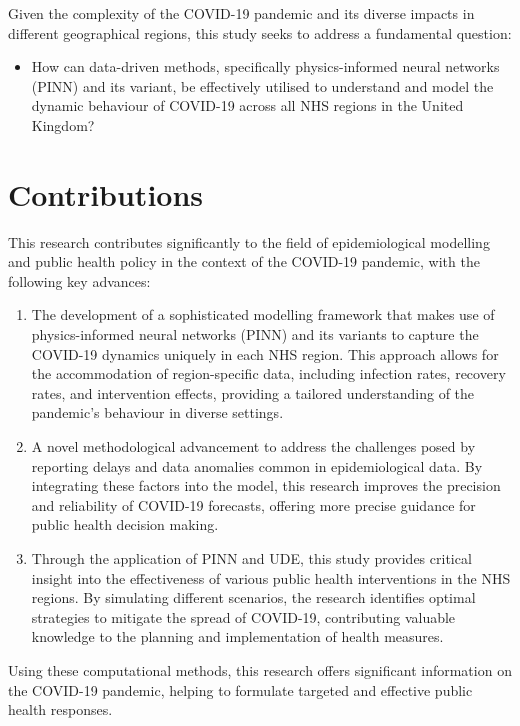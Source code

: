 \documentclass[12pt]{article}
\begin{document}
Given the complexity of the COVID-19 pandemic and its diverse impacts in different geographical regions, this study seeks to address a fundamental question:

\begin{itemize}
    \item How can data-driven methods, specifically physics-informed neural networks (PINN) and its variant, be effectively utilised to understand and model the dynamic behaviour of COVID-19 across all NHS regions in the United Kingdom?
\end{itemize}

\section{Contributions}

This research contributes significantly to the field of epidemiological modelling and public health policy in the context of the COVID-19 pandemic, with the following key advances:

\begin{enumerate}
    \item The development of a sophisticated modelling framework that makes use of physics-informed neural networks (PINN) and its variants to capture the COVID-19 dynamics uniquely in each NHS region. This approach allows for the accommodation of region-specific data, including infection rates, recovery rates, and intervention effects, providing a tailored understanding of the pandemic's behaviour in diverse settings.

    \item  A novel methodological advancement to address the challenges posed by reporting delays and data anomalies common in epidemiological data. By integrating these factors into the model, this research improves the precision and reliability of COVID-19 forecasts, offering more precise guidance for public health decision making.

    \item Through the application of PINN and UDE, this study provides critical insight into the effectiveness of various public health interventions in the NHS regions. By simulating different scenarios, the research identifies optimal strategies to mitigate the spread of COVID-19, contributing valuable knowledge to the planning and implementation of health measures.
\end{enumerate}

 Using these computational methods, this research offers significant information on the COVID-19 pandemic, helping to formulate targeted and effective public health responses.
\end{document}
